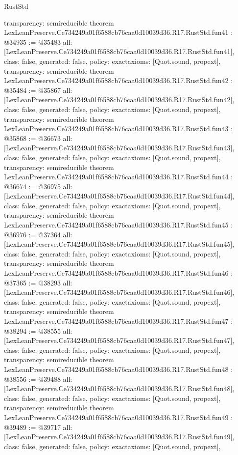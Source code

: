 \begin{lexlean}{RustStd}
\begin{coremodule}
{  transparency: semireducible
}
theorem LexLeanPreserve.Ce734249a01f6588cb76caa0d10039d36.R17.RustStd.fun41 : @34935 := @35483 {
  all: [LexLeanPreserve.Ce734249a01f6588cb76caa0d10039d36.R17.RustStd.fun41],
  class: false,
  generated: false,
  policy: exact{axioms: [Quot.sound, propext]},
  transparency: semireducible
}
theorem LexLeanPreserve.Ce734249a01f6588cb76caa0d10039d36.R17.RustStd.fun42 : @35484 := @35867 {
  all: [LexLeanPreserve.Ce734249a01f6588cb76caa0d10039d36.R17.RustStd.fun42],
  class: false,
  generated: false,
  policy: exact{axioms: [Quot.sound, propext]},
  transparency: semireducible
}
theorem LexLeanPreserve.Ce734249a01f6588cb76caa0d10039d36.R17.RustStd.fun43 : @35868 := @36673 {
  all: [LexLeanPreserve.Ce734249a01f6588cb76caa0d10039d36.R17.RustStd.fun43],
  class: false,
  generated: false,
  policy: exact{axioms: [Quot.sound, propext]},
  transparency: semireducible
}
theorem LexLeanPreserve.Ce734249a01f6588cb76caa0d10039d36.R17.RustStd.fun44 : @36674 := @36975 {
  all: [LexLeanPreserve.Ce734249a01f6588cb76caa0d10039d36.R17.RustStd.fun44],
  class: false,
  generated: false,
  policy: exact{axioms: [Quot.sound, propext]},
  transparency: semireducible
}
theorem LexLeanPreserve.Ce734249a01f6588cb76caa0d10039d36.R17.RustStd.fun45 : @36976 := @37364 {
  all: [LexLeanPreserve.Ce734249a01f6588cb76caa0d10039d36.R17.RustStd.fun45],
  class: false,
  generated: false,
  policy: exact{axioms: [Quot.sound, propext]},
  transparency: semireducible
}
theorem LexLeanPreserve.Ce734249a01f6588cb76caa0d10039d36.R17.RustStd.fun46 : @37365 := @38293 {
  all: [LexLeanPreserve.Ce734249a01f6588cb76caa0d10039d36.R17.RustStd.fun46],
  class: false,
  generated: false,
  policy: exact{axioms: [Quot.sound, propext]},
  transparency: semireducible
}
theorem LexLeanPreserve.Ce734249a01f6588cb76caa0d10039d36.R17.RustStd.fun47 : @38294 := @38555 {
  all: [LexLeanPreserve.Ce734249a01f6588cb76caa0d10039d36.R17.RustStd.fun47],
  class: false,
  generated: false,
  policy: exact{axioms: [Quot.sound, propext]},
  transparency: semireducible
}
theorem LexLeanPreserve.Ce734249a01f6588cb76caa0d10039d36.R17.RustStd.fun48 : @38556 := @39488 {
  all: [LexLeanPreserve.Ce734249a01f6588cb76caa0d10039d36.R17.RustStd.fun48],
  class: false,
  generated: false,
  policy: exact{axioms: [Quot.sound, propext]},
  transparency: semireducible
}
theorem LexLeanPreserve.Ce734249a01f6588cb76caa0d10039d36.R17.RustStd.fun49 : @39489 := @39717 {
  all: [LexLeanPreserve.Ce734249a01f6588cb76caa0d10039d36.R17.RustStd.fun49],
  class: false,
  generated: false,
  policy: exact{axioms: [Quot.sound, propext]},
}
\end{coremodule}
\end{lexlean}

